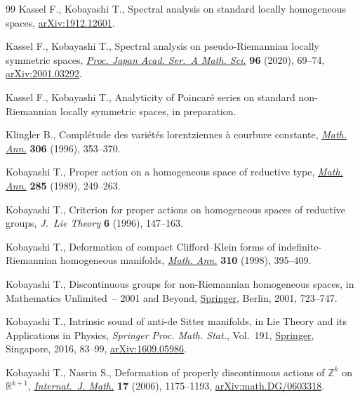 \begin{thebibliography}{99}
Kassel F., Kobayashi T., Spectral analysis on standard locally homogeneous
 spaces, \href{https://arxiv.org/abs/1912.12601}{arXiv:1912.12601}.

Kassel F., Kobayashi T., Spectral analysis on pseudo-{R}iemannian locally
 symmetric spaces, \href{https://doi.org/10.3792/pjaa.96.013}{\textit{Proc. Japan Acad. Ser.~A Math. Sci.}} \textbf{96}
 (2020), 69--74, \href{https://arxiv.org/abs/2001.03292}{arXiv:2001.03292}.

Kassel F., Kobayashi T., Analyticity of {P}oincar\'e series on standard
 non-{R}iemannian locally symmetric spaces, in preparation.

Klingler B., Compl\'etude des vari\'et\'es lorentziennes \`a courbure
 constante, \href{https://doi.org/10.1007/BF01445255}{\textit{Math. Ann.}} \textbf{306} (1996), 353--370.

Kobayashi T., Proper action on a homogeneous space of reductive type,
 \href{https://doi.org/10.1007/BF01443517}{\textit{Math. Ann.}} \textbf{285} (1989), 249--263.

Kobayashi T., Criterion for proper actions on homogeneous spaces of reductive
 groups, \textit{J.~Lie Theory} \textbf{6} (1996), 147--163.

Kobayashi T., Deformation of compact {C}lifford--{K}lein forms of
 indefinite-{R}iemannian homogeneous manifolds, \href{https://doi.org/10.1007/s002080050153}{\textit{Math. Ann.}}
 \textbf{310} (1998), 395--409.

Kobayashi T., Discontinuous groups for non-{R}iemannian homogeneous spaces, in
 Mathematics Unlimited~-- 2001 and Beyond, \href{https://doi.org/10.1007/978-3-642-56478-9_37}{Springer}, Berlin, 2001, 723--747.

Kobayashi T., Intrinsic sound of anti-de {S}itter manifolds, in Lie Theory and
 its Applications in Physics, \textit{Springer Proc. Math. Stat.}, Vol.~191,
 \href{https://doi.org/10.1007/978-981-10-2636-2_6}{Springer}, Singapore, 2016, 83--99, \href{https://arxiv.org/abs/1609.05986}{arXiv:1609.05986}.

Kobayashi T., Nasrin S., Deformation of properly discontinuous actions of
 {${\mathbb Z}^k$} on {${\mathbb R}^{k+1}$}, \href{https://doi.org/10.1142/S0129167X06003862}{\textit{Internat.~J. Math.}}
 \textbf{17} (2006), 1175--1193, \href{https://arxiv.org/abs/math.DG/0603318}{arXiv:math.DG/0603318}.


\end{thebibliography}
